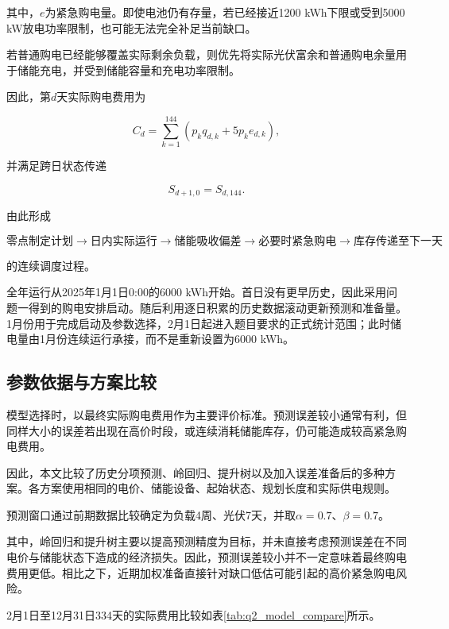 其中，$e$为紧急购电量。即使电池仍有存量，若已经接近1200 kWh下限或受到5000 kW放电功率限制，也可能无法完全补足当前缺口。

若普通购电已经能够覆盖实际剩余负载，则优先将实际光伏富余和普通购电余量用于储能充电，并受到储能容量和充电功率限制。

因此，第$d$天实际购电费用为

\begin{equation}
C_d
=
\sum_{k=1}^{144}
\left(
p_kq_{d,k}
+
5p_ke_{d,k}
\right),
\label{eq:q2_daily_cost}
\end{equation}

并满足跨日状态传递

\begin{equation}
S_{d+1,0}=S_{d,144}.
\label{eq:q2_cross_day}
\end{equation}

由此形成

\[
\text{零点制定计划}
\rightarrow
\text{日内实际运行}
\rightarrow
\text{储能吸收偏差}
\rightarrow
\text{必要时紧急购电}
\rightarrow
\text{库存传递至下一天}
\]

的连续调度过程。

全年运行从2025年1月1日0:00的6000 kWh开始。首日没有更早历史，因此采用问题一得到的购电安排启动。随后利用逐日积累的历史数据滚动更新预测和准备量。1月份用于完成启动及参数选择，2月1日起进入题目要求的正式统计范围；此时储电量由1月份连续运行承接，而不是重新设置为6000 kWh。


\subsection{参数依据与方案比较}

模型选择时，以最终实际购电费用作为主要评价标准。预测误差较小通常有利，但同样大小的误差若出现在高价时段，或连续消耗储能库存，仍可能造成较高紧急购电费用。

因此，本文比较了历史分项预测、岭回归、提升树以及加入误差准备后的多种方案。各方案使用相同的电价、储能设备、起始状态、规划长度和实际供电规则。

预测窗口通过前期数据比较确定为负载4周、光伏7天，并取$\alpha=0.7$、$\beta=0.7$。

其中，岭回归和提升树主要以提高预测精度为目标，并未直接考虑预测误差在不同电价与储能状态下造成的经济损失。因此，预测误差较小并不一定意味着最终购电费用更低。相比之下，近期加权准备直接针对缺口低估可能引起的高价紧急购电风险。

2月1日至12月31日334天的实际费用比较如表\ref{tab:q2_model_compare}所示。

